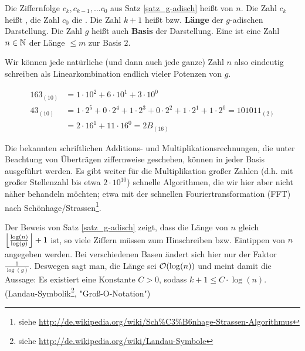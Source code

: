 \begin{defn}
	Die Ziffernfolge $c_k, c_{k-1}, \dots c_0$ aus Satz \ref{satz_g-adisch} heißt  von $n$. 
	Die Zahl $c_k$ heißt , die Zahl $c_0$ die . 
	Die Zahl $k+1$ heißt  bzw. \textbf{Länge} der $g$-adischen Darstellung. 
	Die Zahl $g$ heißt auch \textbf{Basis} der Darstellung. 
	Eine  ist eine Zahl $n \in \NN$ der Länge $\leq m$ zur Basis $2$. 
	 
\end{defn}

\begin{bem}
	Wir können jede natürliche (und dann auch jede ganze) Zahl $n$ also eindeutig schreiben als Linearkombination endlich vieler Potenzen von $g$.
\end{bem}

\begin{bsp}
 \begin{equation}
 \begin{aligned}
	 163_{(10)} &= 1 \cdot 10^2 + 6 \cdot 10^1 + 3 \cdot 10^0 \\
	 43_{(10)}	&= 1 \cdot 2^5 + 0 \cdot 2^4 + 1 \cdot 2^3 + 0 \cdot 2^2 + 1 \cdot 2^1 + 1 \cdot 2^0 = 101011_{(2)} \\
	 &= 2 \cdot 16^1 + 11 \cdot 16^0 = 2B_{(16)}
 \end{aligned}
 \end{equation}
\end{bsp}

Die bekannten schriftlichen Additions- und Multiplikationsrechnungen, die unter Beachtung von Überträgen ziffernweise geschehen, können in jeder Basis ausgeführt werden. 
Es gibt weiter für die Multiplikation großer Zahlen (d.h. mit großer Stellenzahl bis etwa $2 \cdot 10^{10}$) schnelle Algorithmen, die wir hier aber nicht näher behandeln möchten; etwa mit der schnellen Fouriertransformation (FFT) nach Schönhage/Strassen\footnote{siehe \url{http://de.wikipedia.org/wiki/Sch\%C3\%B6nhage-Strassen-Algorithmus}}.

Der Beweis von Satz \ref{satz_g-adisch} zeigt, dass die Länge von $n$ gleich $\floor*{\frac{\log(n)}{\log(g)}}+1$ ist, so viele Ziffern müssen zum Hinschreiben bzw. Eintippen von $n$ angegeben werden. 
Bei verschiedenen Basen ändert sich hier nur der Faktor $\frac{1}{\log(g)}$. 
Deswegen sagt man, die Länge sei $\oh(\log(n))$ und meint damit die Aussage: Es existiert eine Konstante $C > 0$, sodass $k + 1 \leq C \cdot \log(n)$. 
(Landau-Symbolik\footnote{siehe \url{http://de.wikipedia.org/wiki/Landau-Symbole}}, "Groß-O-Notation")

